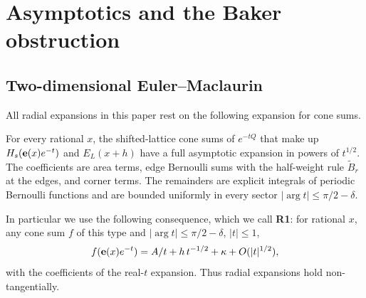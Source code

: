 
\section{Asymptotics and the Baker obstruction}\label{sec:baker}
\subsection{Two-dimensional Euler--Maclaurin}\label{sec:EM}
All radial expansions in this paper rest on the following expansion for cone sums.
\begin{proposition}\label{prop:EM5}
For every rational $x$, the shifted-lattice cone sums of $e^{-tQ}$ that make up $H_s(\mathbf{e}(x)e^{-t})$ and $E_L(x+h)$ have a full asymptotic expansion in powers of
$t^{1/2}$. The coefficients are area terms, edge Bernoulli sums with the half-weight rule $\tilde B_r$ at the edges, and corner terms. The remainders are explicit integrals of periodic Bernoulli functions and are bounded uniformly in every sector $|\arg t|\le\pi/2-\delta$.
\end{proposition}
In particular we use the following consequence, which we call \textbf{R1}: for rational $x$, any cone sum $f$ of this type and $|\arg t|\le\pi/2-\delta$,
$|t|\le1$,
\[
f(\mathbf{e}(x)e^{-t})=A/t+h\,t^{-1/2}+\kappa+O(|t|^{1/2}),
\]
with the coefficients of the real-$t$ expansion. Thus radial expansions hold non-tangentially.


